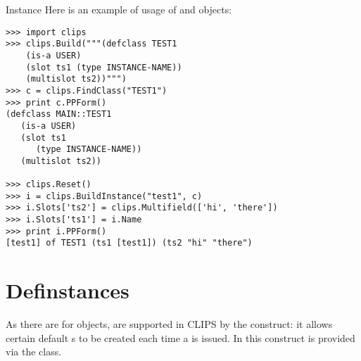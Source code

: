 \begin{classdesc*}{Instance}
Here is an example of usage of  and  objects:

\begin{verbatim}
>>> import clips
>>> clips.Build("""(defclass TEST1
    (is-a USER)
    (slot ts1 (type INSTANCE-NAME))
    (multislot ts2))""")
>>> c = clips.FindClass("TEST1")
>>> print c.PPForm()
(defclass MAIN::TEST1
   (is-a USER)
   (slot ts1
      (type INSTANCE-NAME))
   (multislot ts2))

>>> clips.Reset()
>>> i = clips.BuildInstance("test1", c)
>>> i.Slots['ts2'] = clips.Multifield(['hi', 'there'])
>>> i.Slots['ts1'] = i.Name
>>> print i.PPForm()
[test1] of TEST1 (ts1 [test1]) (ts2 "hi" "there")
\end{verbatim}

\end{classdesc*}



\section{Definstances\label{pyclips-cl-Definstances}}

As there are  for  objects, 
are supported in CLIPS by the  construct: it allows
certain default s to be created each time a
 is issued. In \pyclips{} this construct is provided
via the  class.

